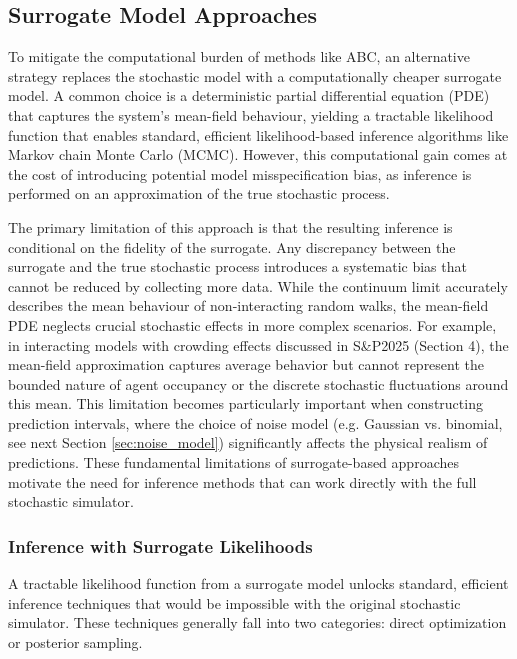 \documentclass{article}
\begin{document}
\subsection{Surrogate Model Approaches}
To mitigate the computational burden of methods like ABC, an alternative strategy replaces the stochastic model with a computationally cheaper surrogate model. A common choice is a deterministic partial differential equation (PDE) that captures the system's mean-field behaviour, yielding a tractable likelihood function that enables standard, efficient likelihood-based inference algorithms like Markov chain Monte Carlo (MCMC). However, this computational gain comes at the cost of introducing potential model misspecification bias, as inference is performed on an approximation of the true stochastic process.



The primary limitation of this approach is that the resulting inference is conditional on the fidelity of the surrogate. Any discrepancy between the surrogate and the true stochastic process introduces a systematic bias that cannot be reduced by collecting more data. While the continuum limit accurately describes the mean behaviour of non-interacting random walks, the mean-field PDE neglects crucial stochastic effects in more complex scenarios. For example, in interacting models with crowding effects discussed in S\&P2025 (Section 4), the mean-field approximation captures average behavior but cannot represent the bounded nature of agent occupancy or the discrete stochastic fluctuations around this mean. This limitation becomes particularly important when constructing prediction intervals, where the choice of noise model (e.g. Gaussian vs. binomial, see next Section \ref{sec:noise_model}) significantly affects the physical realism of predictions. These fundamental limitations of surrogate-based approaches motivate the need for inference methods that can work directly with the full stochastic simulator.



\subsubsection{Inference with Surrogate Likelihoods}
A tractable likelihood function from a surrogate model unlocks standard, efficient inference techniques that would be impossible with the original stochastic simulator. These techniques generally fall into two categories: direct optimization or posterior sampling.
\end{document}
